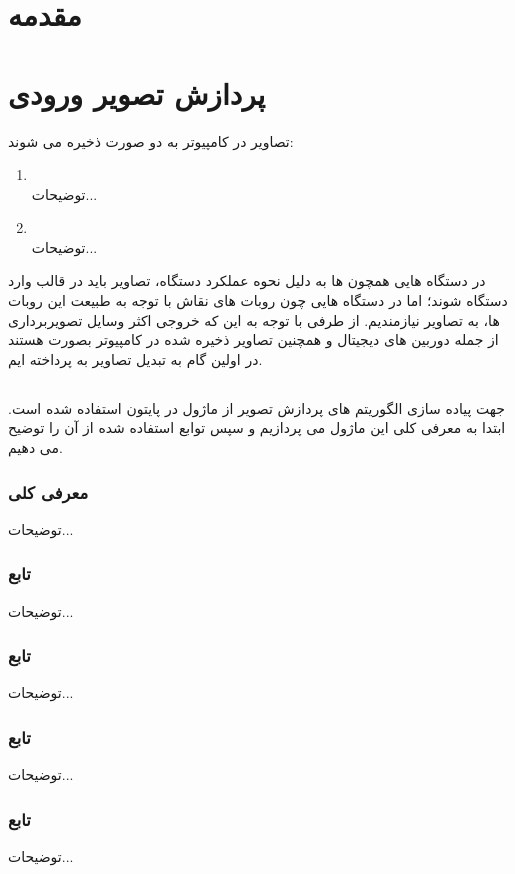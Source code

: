 \documentclass{article}
\begin{document}
\newpage
{\Large\tableofcontents}
\newpage
{\Large\section{مقدمه}
\newpage
\section{پردازش تصویر ورودی}
تصاویر در کامپیوتر به دو صورت ذخیره می شوند:\\
\begin{enumerate}
\item {}\\
توضیحات...
\item {}\\
توضیحات...
\end{enumerate}
در دستگاه هایی همچون 
ها به دلیل نحوه عملکرد دستگاه، تصاویر باید در قالب 
وارد دستگاه شوند؛ اما در دستگاه هایی چون روبات های نقاش با توجه به طبیعت این روبات ها، به تصاویر 
نیازمندیم. از طرفی با توجه به این که  خروجی اکثر وسایل تصویربرداری از جمله دوربین های دیجیتال و همچنین تصاویر ذخیره شده در کامپیوتر بصورت 
هستند در اولین گام به تبدیل تصاویر 
به 
پرداخته ایم.
\subsection{}
جهت پیاده سازی الگوریتم های پردازش تصویر از ماژول 
در پایتون استفاده شده است. ابتدا به معرفی کلی این ماژول می پردازیم و سپس توابع استفاده شده از آن را توضیح می دهیم.
\subsubsection{معرفی کلی 
}
توضیحات...
\subsubsection{تابع
}
توضیحات...
\subsubsection{تابع
}
توضیحات...
\subsubsection{تابع
}
توضیحات...
\subsubsection{تابع
}
توضیحات...
}
\end{document}
